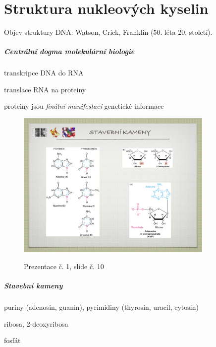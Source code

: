 \documentclass[DIV=8]{scrreprt}
\begin{document}
\chapter{Struktura nukleových kyselin} \label{Struktura nukleových kyselin}

Objev struktury DNA: Watson, Crick, Franklin (50. léta 20. století).

\paragraph{Centrální dogma molekulární biologie}
\begin{myEnumerate}[nosep]
    \item transkripce DNA do RNA
    \item translace RNA na proteiny
    \item proteiny jsou \emph{finální manifestací} genetické informace
\end{myEnumerate}



\begin{figure}
    \caption{Prezentace č. 1, slide č. 10}
    \includegraphics[width=0.85\textwidth]{slides-1/slide-10.jpg}
    \centering
    \label{slides-1-slide-10}
\end{figure}

\paragraph{Stavební kameny}
\begin{myItemize}[nosep]
    \item puriny (adenosin, guanin), pyrimidiny (thyrosin, uracil, cytosin)
    \item ribosa, 2-deoxyribosa
    \item fosfát
\end{myItemize}
\end{document}
